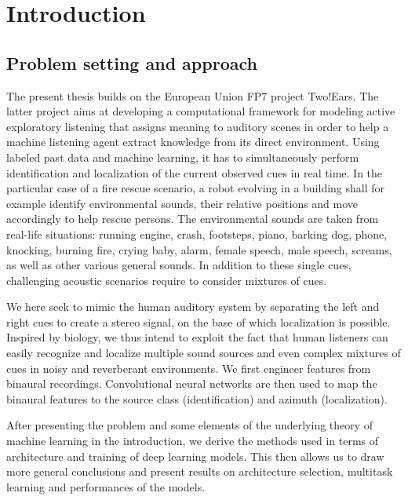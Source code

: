 \chapter{Introduction}
\label{sec:introduction}



\section{Problem setting and approach}

The present thesis builds on the European Union FP7 project Two!Ears. The latter project aims at developing a computational framework for modeling active exploratory listening that assigns meaning to auditory scenes in order to help a machine listening agent extract knowledge from its direct environment. Using labeled past data and machine learning, it has to simultaneously perform identification and localization of the current observed cues in real time. In the particular case of a fire rescue scenario, a robot evolving in a building shall for example identify environmental sounds, their relative positions and move accordingly to help rescue persons. The environmental sounds are taken from real-life situations: running engine, crash, footsteps, piano, barking dog, phone, knocking, burning fire, crying baby, alarm, female speech, male speech, screams, as well as other various general sounds. In addition to these single cues, challenging acoustic scenarios require to consider mixtures of cues.

We here seek to mimic the human auditory system by separating the left and right cues to create a stereo signal, on the base of which localization is possible. Inspired by biology, we thus intend to exploit the fact that human listeners can easily recognize and localize multiple sound sources and even complex mixtures of cues in noisy and reverberant environments. We first engineer features from binaural recordings. Convolutional neural networks are then used to map the binaural features to the source class (identification) and azimuth (localization).

After presenting the problem and some elements of the underlying theory of machine learning in the introduction, we derive the methods used in terms of architecture and training of deep learning models. This then allows us to draw more general conclusions and present results on architecture selection, multitask learning and performances of the models.


